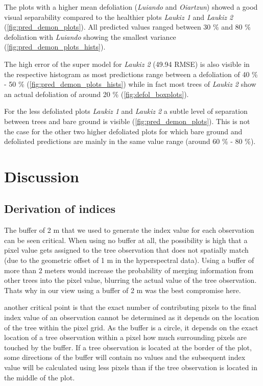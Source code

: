\documentclass[review]{elsarticle}
\begin{document}
\noindent The plots with a higher mean defoliation (\textit{Luiando} and \textit{Oiartzun}) showed a good visual separability compared to the healthier plots \textit{Laukiz 1} and \textit{Laukiz 2} (\autoref{fig:pred_demon_plots}).
All predicted values ranged between 30 \% and 80 \% defoliation with \textit{Luiando} showing the smallest variance (\autoref{fig:pred_demon_plots_hists}).

The high error of the super model for \textit{Laukiz 2} (49.94 RMSE) is also visible in the respective histogram as most predictions range between a defoliation of 40 \% - 50 \% (\autoref{fig:pred_demon_plots_hists}) while in fact most trees of \textit{Laukiz 2} show an actual defoliation of around 20 \% (\autoref{fig:defol_boxplots}).

For the less defoliated plots \textit{Laukiz 1} and \textit{Laukiz 2} a subtle level of separation between trees and bare ground is visible (\autoref{fig:pred_demon_plots}).
This is not the case for the other two higher defoliated plots for which bare ground and defoliated predictions are mainly in the same value range (around 60 \% - 80 \%).

\section{Discussion}

\subsection{Derivation of indices}

\noindent The buffer of 2 m that we used to generate the index value for each observation can be seen critical.
When using no buffer at all, the possibility is high that a pixel value gets assigned to the tree observation that does not spatially match (due to the geometric offset of 1 m in the hyperspectral data).
Using a buffer of more than 2 meters would increase the probability of merging information from other trees into the pixel value, blurring the actual value of the tree observation.
Thats why in our view using a buffer of 2 m was the best compromise here.

another critical point is that the exact number of contributing pixels to the final index value of an observation cannot be determined as it depends on the location of the tree within the pixel grid.
As the buffer is a circle, it depends on the exact location of a tree observation within a pixel how much surrounding pixels are touched by the buffer.
If a tree observation is located at the border of the plot, some directions of the buffer will contain no values and the subsequent index value will be calculated using less pixels than if the tree observation is located in the middle of the plot.
\end{document}
